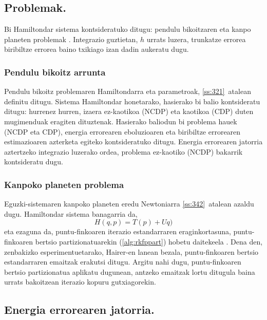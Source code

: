 \subsection{Problemak.}

Bi Hamiltondar sistema kontsideratuko ditugu: pendulu bikoitzaren eta kanpo planeten problemak \cite{Hairer2006} \cite{Dumitru}. Integrazio guztietan, $h$ urrats luzera, trunkatze errorea biribiltze errorea baino txikiago izan dadin aukeratu dugu.

\subsubsection*{Pendulu bikoitz arrunta}
Pendulu bikoitz problemaren Hamiltondarra eta parametroak, \ref{ss:321}~atalean definitu ditugu. Sistema Hamiltondar honetarako, hasierako bi balio kontsideratu ditugu: hurrenez hurren, izaera ez-kaotikoa (NCDP) eta kaotikoa (CDP) duten mugimenduak eragiten dituztenak. Hasierako baliodun bi problema hauek (NCDP eta CDP), energia errorearen eboluzioaren eta biribiltze errorearen estimazioaren azterketa egiteko kontsideratuko ditugu. Energia errorearen jatorria aztertzeko integrazio luzerako ordea, problema ez-kaotiko (NCDP) bakarrik kontsideratu dugu.       

\subsubsection*{Kanpoko planeten problema}
Eguzki-sistemaren kanpoko planeten eredu Newtoniarra \ref{ss:342}~atalean azaldu dugu. Hamiltondar sistema banagarria da,
\begin{equation*}
H(q,p)= T(p)+Uq)
\end{equation*}
eta ezaguna da, puntu-finkoaren iterazio estandarraren eraginkortasuna, puntu-finkoaren bertsio partizionatuarekin (\ref{alg:rkfppart})  hobetu daitekeela  \cite{Sanz-Serna1992}. Dena den, zenbakizko esperimentuetarako, Hairer-en \cite{Hairer2008} lanean bezala, puntu-finkoaren bertsio estandarraren emaitzak erakutsi ditugu. Argitu nahi dugu, puntu-finkoaren bertsio partizionatua aplikatu dugunean, antzeko emaitzak lortu ditugula baina urrats bakoitzean iterazio kopuru gutxiagorekin.  


\subsection{Energia errorearen jatorria.}

